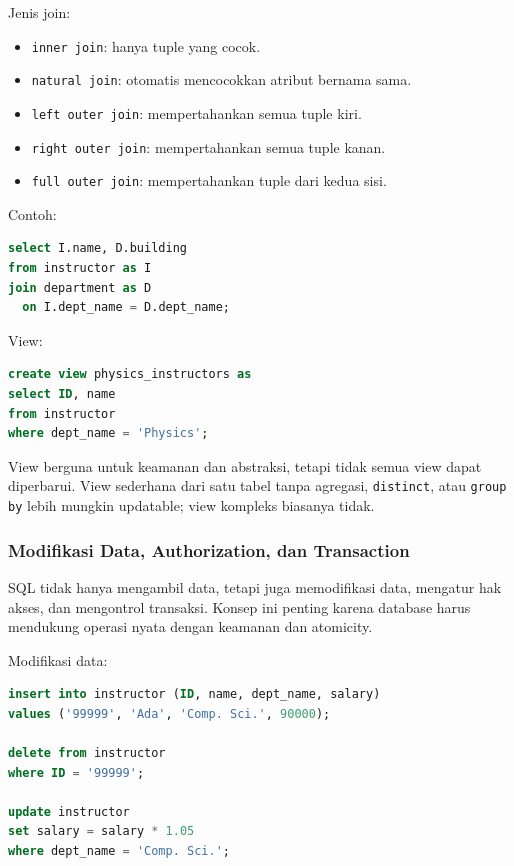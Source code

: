 Jenis join:
\begin{itemize}
    \item \texttt{inner join}: hanya tuple yang cocok.
    \item \texttt{natural join}: otomatis mencocokkan atribut bernama sama.
    \item \texttt{left outer join}: mempertahankan semua tuple kiri.
    \item \texttt{right outer join}: mempertahankan semua tuple kanan.
    \item \texttt{full outer join}: mempertahankan tuple dari kedua sisi.
\end{itemize}

Contoh:
\begin{lstlisting}[language=SQL, caption={Join expression}, label={lst:sql-join}]
select I.name, D.building
from instructor as I
join department as D
  on I.dept_name = D.dept_name;
\end{lstlisting}

View:
\begin{lstlisting}[language=SQL, caption={Create view}, label={lst:sql-view}]
create view physics_instructors as
select ID, name
from instructor
where dept_name = 'Physics';
\end{lstlisting}

View berguna untuk keamanan dan abstraksi, tetapi tidak semua view dapat diperbarui. View sederhana dari satu tabel tanpa agregasi, \texttt{distinct}, atau \texttt{group by} lebih mungkin updatable; view kompleks biasanya tidak.

\subsubsection{Modifikasi Data, Authorization, dan Transaction}

\begin{jawab}
SQL tidak hanya mengambil data, tetapi juga memodifikasi data, mengatur hak akses, dan mengontrol transaksi. Konsep ini penting karena database harus mendukung operasi nyata dengan keamanan dan atomicity.
\end{jawab}

Modifikasi data:
\begin{lstlisting}[language=SQL, caption={Insert delete update}, label={lst:sql-modification}]
insert into instructor (ID, name, dept_name, salary)
values ('99999', 'Ada', 'Comp. Sci.', 90000);

delete from instructor
where ID = '99999';

update instructor
set salary = salary * 1.05
where dept_name = 'Comp. Sci.';
\end{lstlisting}

